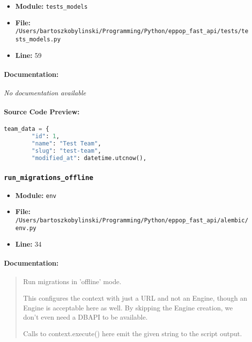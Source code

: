 \documentclass[11pt,a4paper]{article}
\begin{document}
\begin{itemize}
    \item \textbf{Module:} \texttt{tests\_models}
    \item \textbf{File:} \texttt{/Users/bartoszkobylinski/Programming/Python/eppop\_fast\_api/tests/tests\_models.py}
    \item \textbf{Line:} 59
\end{itemize}

\paragraph{Documentation:} \textit{No documentation available}

\paragraph{Source Code Preview:}
\begin{lstlisting}[language=Python]
    team_data = {
        "id": 1,
        "name": "Test Team",
        "slug": "test-team",
        "modified_at": datetime.utcnow(),
\end{lstlisting}

\vspace{1em}
\subsubsection{\texttt{run\_migrations\_offline}}

\begin{itemize}
    \item \textbf{Module:} \texttt{env}
    \item \textbf{File:} \texttt{/Users/bartoszkobylinski/Programming/Python/eppop\_fast\_api/alembic/env.py}
    \item \textbf{Line:} 34
\end{itemize}

\paragraph{Documentation:}
\begin{quote}
Run migrations in 'offline' mode.

This configures the context with just a URL
and not an Engine, though an Engine is acceptable
here as well.  By skipping the Engine creation,
we don't even need a DBAPI to be available.

Calls to context.execute() here emit the given string to the
script output.
\end{quote}
\end{document}
